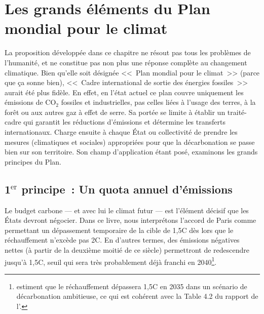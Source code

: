 \documentclass[a5paper,french]{memoir}
\begin{document}
\chapter{Les grands éléments du Plan mondial pour le climat\label{ch:principes}}

La proposition développée dans ce chapitre ne résout pas tous les problèmes de l'humanité, et ne constitue pas non plus une réponse complète au changement climatique. Bien qu'elle soit désignée <<~Plan mondial pour le climat~>> (parce que ça sonne bien), <<~Cadre international de sortie des énergies fossiles~>> aurait été plus fidèle.  %
En effet, en l'état actuel ce plan couvre uniquement les émissions de CO$_\text{2}$ fossiles et industrielles, pas celles liées à l'usage des terres, à la forêt ou aux autres gaz à effet de serre. %
Sa portée se limite à établir un traité-cadre qui garantit les réductions d'émissions et détermine les transferts internationaux. Charge ensuite à chaque État ou collectivité de prendre les mesures (climatiques et sociales) appropriées pour que la décarbonation se passe bien sur son territoire. Son champ d'application étant posé, %
examinons les grands principes du Plan.

\section{1$^\text{er}$ principe~: Un quota annuel d'émissions}

Le budget carbone --- et avec lui le climat futur --- est l'élément décisif que les États devront négocier. Dans ce livre, nous interprétons l'accord de Paris comme permettant un dépassement temporaire de la cible de 1,5\textdegree{}C dès lors que le réchauffement n'excède pas 2\textdegree{}C. En d'autres termes, des émissions négatives nettes (à partir de la deuxième moitié de ce siècle) permettront de redescendre jusqu'à 1,5\textdegree{}C, seuil qui sera très probablement déjà franchi en 2040\footnote{\citet{diffenbaugh_data-driven_2023} estiment que le réchauffement dépassera 1,5\textdegree{}C en 2035 dans un scénario de décarbonation ambitieuse, ce qui est cohérent avec la Table 4.2 du rapport de l'\citet{ipcc_climate_2021}.}. 
\end{document}
